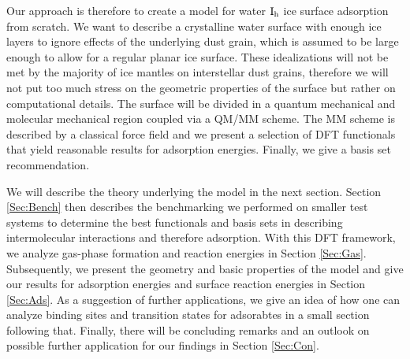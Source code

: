 Our approach is therefore to create a model for water $\text I_\text h$ ice surface
adsorption from scratch. We want to describe a crystalline water surface with
enough ice layers to ignore effects of the underlying dust
grain, which is assumed to be large enough to allow for a regular planar ice
surface. These idealizations will not be met by the majority of ice mantles on
interstellar dust grains, therefore we will not put too much stress on the
geometric properties of the surface but rather on computational details. The
surface will be divided in a quantum mechanical and molecular mechanical region
coupled via a QM/MM scheme. The MM scheme is described by a classical force
field and we present a selection of DFT functionals that yield reasonable
results for adsorption energies. Finally, we give a basis set recommendation.
% 

We will describe the theory underlying the model in the next section. Section
\ref{Sec:Bench} then describes the benchmarking we performed on smaller test
systems to determine the best functionals and basis sets in describing
intermolecular interactions and therefore adsorption. With this DFT
framework, we analyze gas-phase formation and reaction energies in Section
\ref{Sec:Gas}. Subsequently, we present the geometry and basic properties of the
model and give our results for adsorption energies and surface reaction
energies in Section \ref{Sec:Ads}. As a suggestion of further applications, we
give an idea of how one can analyze binding sites and transition states for
adsorabtes in a small section following that. Finally, there will be concluding
remarks and an outlook on possible further application for our findings in
Section \ref{Sec:Con}.


